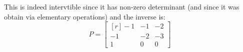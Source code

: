 \documentclass[crop=false,class=article]{standalone}                           %
\begin{document}
        This is indeed intervtible since it has non-zero determinant (and since
        it was obtain via elementary operations) and the inverse is:
        \begin{equation}
            P=
            \begin{bmatrix*}[r]
                \minus{1}&\minus{1}&\minus{2}\\
                \minus{1}&\minus{2}&\minus{3}\\
                1&0&0
            \end{bmatrix*}
        \end{equation}
\end{document}
